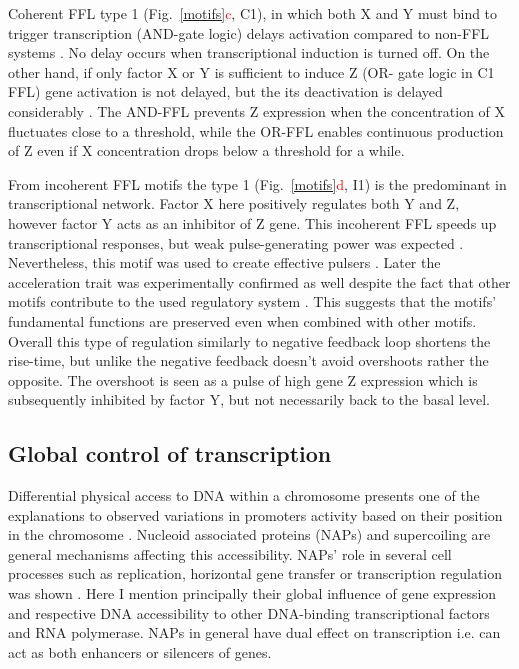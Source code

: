 Coherent FFL type 1 (Fig.~\ref{motifs}\textcolor{red}{c}, C1), in which both X and Y must bind to trigger transcription (AND-gate logic) delays activation compared to non-FFL systems \cite{mangan2003coherent}.
No delay occurs when transcriptional induction is turned off.
On the other hand, if only factor X or Y is sufficient to induce Z (OR- gate logic in C1 FFL) gene activation is not delayed, but the its deactivation is delayed considerably \cite{kalir2005coherent}.
The AND-FFL prevents Z expression when the concentration of X fluctuates close to a threshold, while the OR-FFL enables continuous production of Z even if X concentration drops below a threshold for a while.

From incoherent FFL motifs the type 1 (Fig.~\ref{motifs}\textcolor{red}{d}, I1) is the predominant in  transcriptional network.
Factor X here positively regulates both Y and Z, however factor Y acts as an inhibitor of Z gene.
This incoherent FFL speeds up transcriptional responses, but weak pulse-generating power was expected \cite{mangan2003structure}.
Nevertheless, this motif was used to create effective pulsers \cite{basu2004spatiotemporal}.
Later the acceleration trait was experimentally confirmed as well despite the fact that other motifs contribute to the used regulatory system \cite{mangan2006incoherent}.
This suggests that the motifs' fundamental functions are preserved even when combined with other motifs.
Overall this type of regulation similarly to negative feedback loop shortens the rise-time, but unlike the negative feedback doesn't avoid overshoots rather the opposite.
The overshoot is seen as a pulse of high gene Z expression which is subsequently inhibited by factor Y, but not necessarily back to the basal level.

\subsection{Global control of transcription}
Differential physical access to DNA within a chromosome presents one of the explanations to observed variations in promoters activity based on their position in the chromosome \cite{bryant2014chromosome}.
Nucleoid associated proteins (NAPs) and supercoiling are general mechanisms affecting this accessibility.
NAPs' role in several cell processes such as replication, horizontal gene transfer or transcription regulation was shown \cite{dixon1984protein, kayoko1992histone, aznar2013hha}.
Here I mention principally their global influence of gene expression and respective DNA accessibility to other DNA-binding transcriptional factors and RNA polymerase.
NAPs in general have dual effect on transcription i.e. can act as both enhancers or silencers of genes.

